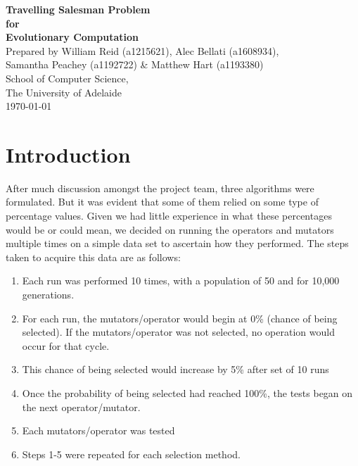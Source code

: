 \documentclass[a4paper,12pt]{article}
\begin{document}
\begin{titlepage}
\begin{center}
\vspace*{3cm}
{\LARGE\bf Travelling Salesman Problem}\\
\vspace{1.5cm}
{\large\bf for}\\
\vspace{1.5cm}
{\LARGE\bf Evolutionary Computation}\\
\vspace{5cm}
Prepared by William Reid (a1215621), Alec Bellati (a1608934),\\
Samantha Peachey (a1192722) \& Matthew Hart (a1193380)\\
\vspace{1cm}
School of Computer Science,\\
The University of Adelaide\\
\vspace{1cm}
\today
\end{center}
\end{titlepage}


\section{Introduction}

After much discussion amongst the project team, three algorithms were formulated. But it was evident that some of them relied on some type of percentage values. Given we had little experience in what these percentages would be or could mean, we decided on running the operators and mutators multiple times on a simple data set to ascertain how they performed. The steps taken to acquire this data are as follows:
\begin{enumerate}
\item Each run was performed 10 times, with a population of 50 and for 10,000 generations.
\item For each run, the mutators/operator would begin at 0\% (chance of being selected). If the mutators/operator was not selected, no operation would occur for that cycle.
\item This chance of being selected would increase by 5\% after set of 10 runs
\item Once the probability of being selected had reached 100\%, the tests began on the next operator/mutator.
\item Each mutators/operator was tested
\item Steps 1-5 were repeated for each selection method.
\end{enumerate}
\end{document}
